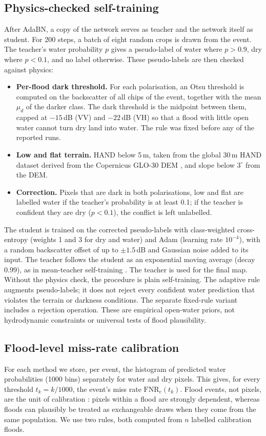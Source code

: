 \documentclass[a4paper,fleqn]{cas-sc}
\begin{document}
\subsection{Physics-checked self-training}
After AdaBN, a copy of the network serves as teacher and the network itself as student. For 200 steps, a batch of eight random crops is drawn from the event. The teacher's water probability $p$ gives a pseudo-label of water where $p>0.9$, dry where $p<0.1$, and no label otherwise. These pseudo-labels are then checked against physics:
\begin{itemize}
\item \textbf{Per-flood dark threshold.} For each polarisation, an Otsu threshold \citep{otsu1979threshold} is computed on the backscatter of all chips of the event, together with the mean $\mu_d$ of the darker class. The dark threshold is the midpoint between them, capped at $-15$\,dB (VV) and $-22$\,dB (VH) so that a flood with little open water cannot turn dry land into water. The rule was fixed before any of the reported runs.
\item \textbf{Low and flat terrain.} HAND below 5\,m, taken from the global 30\,m HAND dataset derived from the Copernicus GLO-30 DEM \citep{glo30hand2022}, and slope below $3^\circ$ from the DEM.
\item \textbf{Correction.} Pixels that are dark in both polarisations, low and flat are labelled water if the teacher's probability is at least 0.1; if the teacher is confident they are dry ($p<0.1$), the conflict is left unlabelled.
\end{itemize}
The student is trained on the corrected pseudo-labels with class-weighted cross-entropy (weights 1 and 3 for dry and water) and Adam (learning rate $10^{-4}$), with a random backscatter offset of up to $\pm1.5$\,dB and Gaussian noise added to its input. The teacher follows the student as an exponential moving average (decay 0.99), as in mean-teacher self-training \citep{tarvainen2017meanteacher,chen2026cimttda}. The teacher is used for the final map. Without the physics check, the procedure is plain self-training.
The adaptive rule augments pseudo-labels; it does not reject every confident water prediction that violates the terrain or darkness conditions. The separate fixed-rule variant includes a rejection operation. These are empirical open-water priors, not hydrodynamic constraints or universal tests of flood plausibility.

\subsection{Flood-level miss-rate calibration}
\label{sec:calib}
For each method we store, per event, the histogram of predicted water probabilities (1000 bins) separately for water and dry pixels. This gives, for every threshold $t_k=k/1000$, the event's miss rate $\mathrm{FNR}_e(t_k)$. Flood events, not pixels, are the unit of calibration \citep{dunn2023hierarchical}: pixels within a flood are strongly dependent, whereas floods can plausibly be treated as exchangeable draws when they come from the same population. We use two rules, both computed from $n$ labelled calibration floods.
\end{document}
